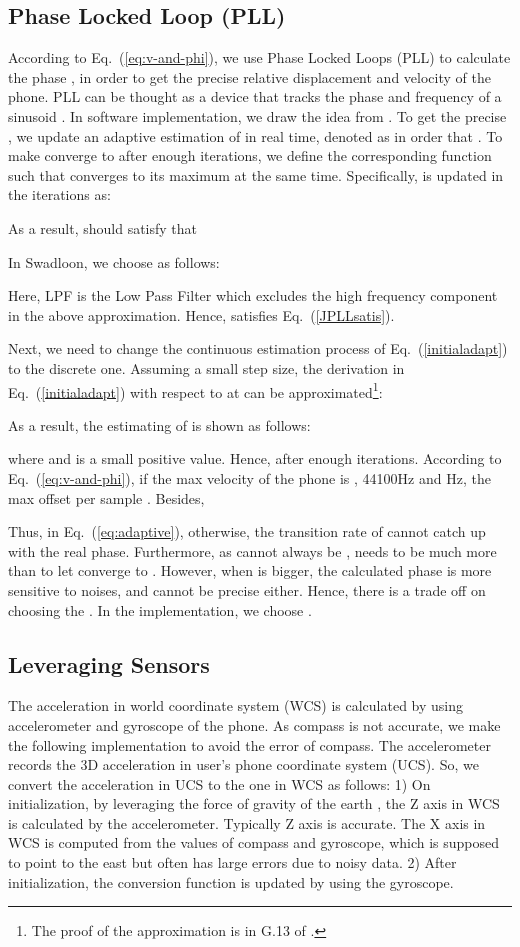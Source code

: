 \documentclass[]{sig-alternate-10pt}
\newcommand{\eqqref}[1]{Eq.~(\ref{#1})}
\def \ourprotocol{Swadloon\xspace}
\begin{document}
\subsection{Phase Locked Loop (PLL)}
\label{sec:stvt}
According to \eqqref{eq:v-and-phi}, we use Phase
Locked Loops (PLL) to calculate the phase , in order to get
the precise relative displacement  and velocity  of the phone.
PLL can be thought as a device that tracks the phase and frequency of
a sinusoid \cite{rice2008digital}. In software implementation, we draw
the idea from \cite{citeulike:5657344}.
To get the precise , we update an adaptive estimation of
 in real time, denoted as
 in order that .  To make
 converge to  after enough iterations, we define the
corresponding function  such that
 converges to its maximum at the same time.
Specifically,  is updated in the iterations as:

As a result,  should satisfy that


In \ourprotocol, we choose  as follows:

Here, LPF is the Low Pass Filter which excludes the high frequency component in the above approximation.
Hence,  satisfies \eqqref{JPLLsatis}.

Next,  we need to change the continuous estimation process of \eqqref{initialadapt} to the discrete
one.
Assuming a small step size, the derivation in \eqqref{initialadapt}
with respect to  at  can be approximated\footnote{The
  proof of the approximation is in G.13 of \cite{citeulike:5657344}.}:


As a result, the estimating of  is shown as follows:

where  and  is a small positive value.
Hence,  after enough iterations.
According to \eqqref{eq:v-and-phi}, if the max velocity of the phone is
,
44100Hz and Hz, the max offset per sample
.
Besides,


Thus, 
in \eqqref{eq:adaptive}, otherwise, the transition rate of 
cannot catch up with the real phase. Furthermore, as
 cannot always be ,
 needs to be much more than  to let  converge
to .
However, when  is bigger, the calculated phase is more sensitive
to noises, and cannot be precise either. Hence, there is a trade off on
choosing the .  In the implementation, we choose .


\subsection{Leveraging Sensors}
The acceleration in world
 coordinate system (WCS) is calculated by using accelerometer and
 gyroscope of the phone.
As compass is not accurate,  we make the following implementation to
 avoid the error of compass.
The accelerometer records the 3D acceleration in user's phone
 coordinate system (UCS).
So, we convert the acceleration in UCS to the one in WCS as follows: 1) On
initialization, by leveraging the force of gravity of the earth
\cite{zaxis}, the Z axis in WCS is calculated by the accelerometer.
Typically Z axis is accurate.
The X axis in WCS is computed from the values of compass and gyroscope,
 which is supposed to point to the east but often has large errors due
 to noisy data.
2) After initialization, the conversion
 function is updated by using the gyroscope.
\end{document}

